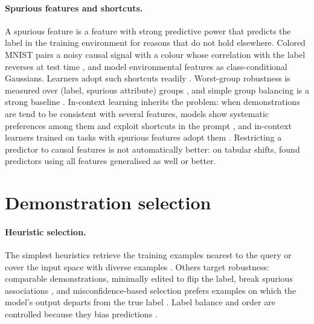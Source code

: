 \paragraph{Spurious features and shortcuts.}
A spurious feature is a feature with strong predictive power that predicts the label in the training environment for reasons that do not hold elsewhere.
Colored MNIST pairs a noisy causal signal with a colour whose correlation with the label reverses at test time \citep{arjovsky2019invariant}, and \citet{rosenfeld2021risks} model environmental features as class-conditional Gaussians.
Learners adopt such shortcuts readily \citep{geirhos2020shortcut,nagarajan2021understanding}.
Worst-group robustness is measured over (label, spurious attribute) groups \citep{sagawa2020distributionally}, and simple group balancing is a strong baseline \citep{idrissi2022simple}.
In-context learning inherits the problem: when demonstrations are tend to be consistent with several features, models show systematic preferences among them \citep{si2023measuring} and exploit shortcuts in the prompt \citep{tang2023large}, and in-context learners trained on tasks with spurious features adopt them \citep{harutyunyan2026incontext,chen2026incontext}.
Restricting a predictor to causal features is not automatically better: on tabular shifts, \citet{nastl2024causal} found predictors using all features generalised as well or better.

\section{Demonstration selection}
\label{sec:bg-selection}

\paragraph{Heuristic selection.}
The simplest heuristics retrieve the training examples nearest to the query \citep{liu2022what} or cover the input space with diverse examples \citep{levy2023diverse,gupta2023coverage}.
Others target robustness: comparable demonstrations, minimally edited to flip the label, break spurious associations \citep{fan2024comparable}, and misconfidence-based selection prefers examples on which the model's output departs from the true label \citep{xu2024misconfidence}.
Label balance and order are controlled because they bias predictions \citep{zhao2021calibrate,lu2022fantastically}.


